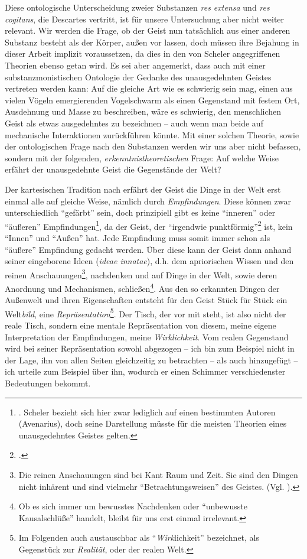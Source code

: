 \documentclass[a4paper, 12pt]{article}
\begin{document}
\begin{onehalfspace}
Diese ontologische Unterscheidung zweier Substanzen \emph{res extensa} und \emph{res cogitans}, die Descartes vertritt, ist für unsere Untersuchung aber nicht weiter relevant. Wir werden die Frage, ob der Geist nun tatsächlich aus einer anderen Substanz besteht als der Körper, außen vor lassen, doch müssen ihre Bejahung in dieser Arbeit implizit voraussetzen, da dies in den von Scheler angegriffenen Theorien ebenso getan wird. Es sei aber angemerkt, dass auch mit einer substanzmonistischen Ontologie der Gedanke des unausgedehnten Geistes vertreten werden kann: Auf die gleiche Art wie es schwierig sein mag, einen aus vielen Vögeln emergierenden Vogelschwarm als einen Gegenstand mit festem Ort, Ausdehnung und Masse zu beschreiben, wäre es schwierig, den menschlichen Geist als etwas ausgedehntes zu bezeichnen -- auch wenn man beide auf mechanische Interaktionen zurückführen könnte. Mit einer solchen Theorie, sowie der ontologischen Frage nach den Substanzen werden wir uns aber nicht befassen, sondern mit der folgenden, \emph{erkenntnistheoretischen} Frage: Auf welche Weise erfährt der unausgedehnte Geist die Gegenstände der Welt?


Der kartesischen Tradition nach erfährt der Geist die Dinge in der Welt erst einmal alle auf gleiche Weise, nämlich durch \emph{Empfindungen}. Diese können zwar unterschiedlich "`gefärbt"' sein, doch prinzipiell gibt es keine "`inneren"' oder "`äußeren"' Empfindungen\footnote{\Cite[Vgl.][S. 501]{scheler-ethik}. Scheler bezieht sich hier zwar lediglich auf einen bestimmten Autoren (Avenarius), doch seine Darstellung müsste für die meisten Theorien eines unausgedehntes Geistes gelten.}, da der Geist, der "`irgendwie punktförmig"'\footnote{\Cite[Siehe][S. 270]{scheler-idole}.} ist, kein "`Innen"' und "`Außen"' hat. Jede Empfindung muss somit immer schon als "`äußere"' Empfindung gedacht werden. Über diese kann der Geist dann anhand seiner eingeborene Ideen (\emph{ideae innatae}), d.h. dem apriorischen Wissen und den reinen Anschauungen\footnote{Die reinen Anschauungen sind bei Kant Raum und Zeit. Sie sind den Dingen nicht inhärent und sind vielmehr "`Betrachtungsweisen"' des Geistes. (Vgl. \cite{sep-kant}).}, nachdenken und auf Dinge in der Welt, sowie deren Anordnung und Mechanismen, schließen\footnote{Ob es sich immer um bewusstes Nachdenken oder "`unbewusste Kausalschlüße"' handelt, bleibt für uns erst einmal irrelevant.}. Aus den so erkannten Dingen der Außenwelt und ihren Eigenschaften entsteht für den Geist Stück für Stück ein Welt\emph{bild}, eine \emph{Repräsentation}\footnote{Im Folgenden auch austauschbar als "`\emph{Wirk}lichkeit"' bezeichnet, als Gegenstück zur \emph{Realität}, oder der realen Welt.}. Der Tisch, der vor mit steht, ist also nicht der reale Tisch, sondern eine mentale Repräsentation von diesem, meine eigene Interpretation der Empfindungen, meine \emph{Wirklichkeit}. Vom realen Gegenstand wird bei seiner Repräsentation sowohl abgezogen -- ich bin zum Beispiel nicht in der Lage, ihn von allen Seiten gleichzeitig zu betrachten -- als auch hinzugefügt -- ich urteile zum Beispiel über ihn, wodurch er einen Schimmer verschiedenster Bedeutungen bekommt.


\end{onehalfspace}
\end{document}

